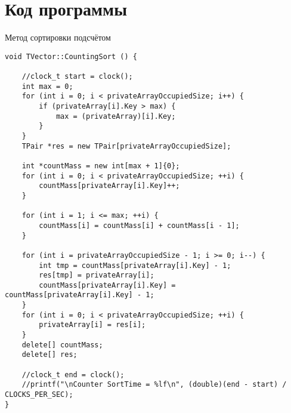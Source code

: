 \documentclass[pdf, unicode, 12pt, a4paper,oneside,fleqn]{article}
\begin{document}
\section{Код программы}
Метод сортировки подсчётом
\begin{lstlisting}
void TVector::CountingSort () {

    //clock_t start = clock();
    int max = 0;
    for (int i = 0; i < privateArrayOccupiedSize; i++) {
        if (privateArray[i].Key > max) {
            max = (privateArray)[i].Key;
        }
    }
    TPair *res = new TPair[privateArrayOccupiedSize];

    int *countMass = new int[max + 1]{0};
    for (int i = 0; i < privateArrayOccupiedSize; ++i) {
        countMass[privateArray[i].Key]++;
    }

    for (int i = 1; i <= max; ++i) {
        countMass[i] = countMass[i] + countMass[i - 1];
    }

    for (int i = privateArrayOccupiedSize - 1; i >= 0; i--) {
        int tmp = countMass[privateArray[i].Key] - 1;
        res[tmp] = privateArray[i];
        countMass[privateArray[i].Key] = countMass[privateArray[i].Key] - 1;
    }
    for (int i = 0; i < privateArrayOccupiedSize; ++i) {
        privateArray[i] = res[i];
    }
    delete[] countMass;
    delete[] res;

    //clock_t end = clock();
    //printf("\nCounter SortTime = %lf\n", (double)(end - start) / CLOCKS_PER_SEC);
}
\end{lstlisting}

\newpage
\end{document}
